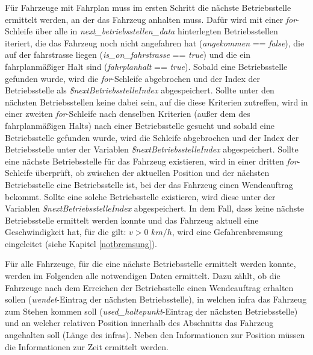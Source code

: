 Für Fahrzeuge mit Fahrplan muss im ersten Schritt die nächste Betriebsstelle ermittelt werden, an der das Fahrzeug anhalten muss. Dafür wird mit einer \textit{for}-Schleife über alle in \textit{next\_betriebsstellen\_data} hinterlegten Betriebsstellen iteriert, die das Fahrzeug noch nicht angefahren hat (\textit{angekommen} == \textit{false}), die auf der \Gls{fahrstrasse} liegen (\textit{is\_on\_fahrstrasse} == \textit{true}) und die ein fahrplanmäßiger Halt sind (\textit{fahrplanhalt} == \textit{true}). Sobald eine Betriebsstelle gefunden wurde, wird die \textit{for}-Schleife abgebrochen und der Index der Betriebsstelle als \textit{\$nextBetriebsstelleIndex} abgespeichert. Sollte unter den nächsten Betriebsstellen keine dabei sein, auf die diese Kriterien zutreffen, wird in einer zweiten \textit{for}-Schleife nach denselben Kriterien (außer dem des fahrplanmäßigen Halts) nach einer Betriebsstelle gesucht und sobald eine Betriebsstelle gefunden wurde, wird die Schleife abgebrochen und der Index der Betriebsstelle unter der Variablen \textit{\$nextBetriebsstelleIndex} abgespeichert. Sollte eine nächste Betriebsstelle für das Fahrzeug existieren, wird in einer dritten \textit{for}-Schleife überprüft, ob zwischen der aktuellen Position und der nächsten Betriebsstelle eine Betriebsstelle ist, bei der das Fahrzeug einen Wendeauftrag bekommt. Sollte eine solche Betriebsstelle existieren, wird diese unter der Variablen \textit{\$nextBetriebsstelleIndex} abgespeichert. In dem Fall, dass keine nächste Betriebsstelle ermittelt werden konnte und das Fahrzeug aktuell eine Geschwindigkeit hat, für die gilt: $v>0$ $km/h$, wird eine Gefahrenbremsung eingeleitet (siehe Kapitel \ref{notbremsung}). 

Für alle Fahrzeuge, für die eine nächste Betriebsstelle ermittelt werden konnte, werden im Folgenden alle notwendigen Daten ermittelt. Dazu zählt, ob die Fahrzeuge nach dem Erreichen der Betriebsstelle einen Wendeauftrag erhalten sollen (\textit{wendet}-Eintrag der nächsten Betriebsstelle), in welchen \ac{infra} das Fahrzeug zum Stehen kommen soll (\textit{used\_haltepunkt}-Eintrag der nächsten Betriebsstelle) und an welcher relativen Position innerhalb des Abschnitts das Fahrzeug angehalten soll (Länge des \ac{infra}s). Neben den Informationen zur Position müssen die Informationen zur Zeit ermittelt werden. 

